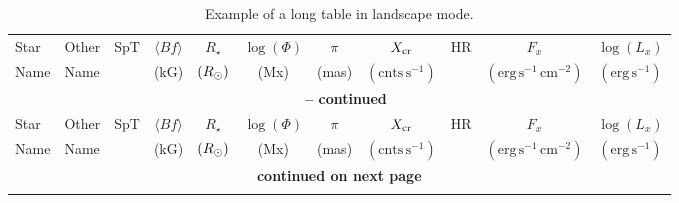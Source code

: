 \begin{landscape}
\onehalfspacing
\begin{center}
    \begin{longtable}{l l l c c c c c c c c} 
        \caption[Example of a table using longtable.]
         {Example of a long table in landscape mode.}
        \label{tab:lms_xray_data}\\
        
        \hline
        \hline
        Star & Other & SpT & $\langle Bf \rangle$ & $R_\star$ & $\log(\Phi)$ & $\pi$ & $X_{\rm cr}$ & HR & $F_x$ & $\log(L_x)$ \\
        Name & Name & & (kG) & $(R_{\odot})$ & (Mx) & (mas) & $\mathrm{(cnts\, s^{-1})}$ &  & $\mathrm{(erg\, s^{-1}\, cm^{-2})}$ & $\mathrm{(erg\, s^{-1})}$ \\
        \hline
        \endfirsthead
        
        \multicolumn{11}{c}{\bf \tablename\ \thetable{} -- continued} \\
        \hline 
        \hline
        Star & Other & SpT & $\langle Bf \rangle$ & $R_\star$ & $\log(\Phi)$ & $\pi$ & $X_{\rm cr}$ & HR & $F_x$ & $\log(L_x)$ \\
        Name & Name & & (kG) & $(R_{\odot})$ & (Mx) & (mas) & $\mathrm{(cnts\, s^{-1})}$ &  & $\mathrm{(erg\, s^{-1}\, cm^{-2})}$ & $\mathrm{(erg\, s^{-1})}$ \\
        \hline
        \endhead
        
        \hline
        \multicolumn{11}{c}{\bf \footnotesize continued on next page} \\
        \endfoot
        

\end{longtable}
\end{center}
\end{landscape}
